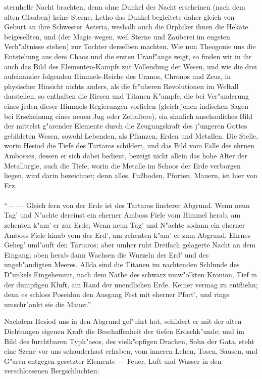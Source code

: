 \documentclass[a4paper, 11pt, oneside, polutonikogreek, german]{article}
\begin{document}
\begin{enumerate}
sternhelle Nacht brachten, denn ohne Dunkel der Nacht erscheinen (nach dem alten Glauben) keine Sterne, Letho das Dunkel begleitete daher gleich von Geburt an ihre Schwester Asteria, weshalb auch die Orphiker ihnen die Hekate beigesellten, und (der Magie wegen, weil Sterne und Zauberei im engsten Verh"altnisse stehen) zur Tochter derselben machten. Wie nun Theogonie uns die Entstehung aus dem Chaos und die ersten Uranf"ange zeigt, so finden wir in ihr auch das Bild des Elementen-Kampfs zur Vollendung der Wesen, und wie die drei aufeinander folgenden Himmels-Reiche des Uranos, Chronos und Zeus, in physischer Hinsicht nichts anders, als die fr"uheren Revolutionen im Weltall darstellen, so enthalten die Riesen und Titanen K"ampfe, die bei Ver"anderung eines jeden dieser Himmels-Regierungen vorfielen (gleich jenen indischen Sagen bei Erscheinung eines neuen Jug oder Zeitalters), ein sinnlich anschauliches Bild der mittelst g"arender Elemente durch die Zeugungskraft des j"ungeren Gottes gebildeten Wesen, sowohl Lebenden, als Pflanzen, Erden und Metallen. Die Stelle, worin Hesiod die Tiefe des Tartaros schildert, und das Bild vom Falle des ehrnen Ambosses, dessen er sich dabei bedient, bezeigt nicht allein das hohe Alter der Metallurgie, auch die Tiefe, worin die Metalle im Schoos der Erde verborgen liegen, wird darin bezeichnet; denn alles, Fußboden, Pforten, Mauern, ist hier von Erz.
\end{enumerate}
\paragraph{}
"`--- --- Gleich fern von der Erde ist des Tartaros finsterer Abgrund. Wenn neun Tag' und N"achte dereinst ein eherner Amboss Fiele vom Himmel herab, am zehenten k"am' er zur Erde; Wenn neun Tag' und N"achte sodann ein eherner Amboss Fiele hinab vom der Erd', am zehenten k"am' er zum Abgrund. Ehrnes Geheg' uml"auft den Tartaros; aber umher ruht Dreifach gelagerte Nacht an dem Eingang; oben herab dann Wachsen die Wurzeln der Erd' und des ungeb"andigten Meeres. Allda sind die Titanen im nachtenden Schlunde des D"unkels Eingehemmt, nach dem Nathe des schwarz umw"olkten Kronion, Tief in der dumpfigen Kluft, am Rand der unendlichen Erde. Keiner vermag zu entfliehn; denn es schloss Poseidon den Ausgang Fest mit eherner Pfort', und rings umschr"ankt sie die Mauer."'

Nachdem Hesiod uns in den Abgrund gef"uhrt hat, schildert er mit der alten Dichtungen eigenen Kraft die Beschaffenheit der tiefen Erdschk"unde; und im Bild des furchtbaren Typh"aeos, des vielk"opfigen Drachen, Sohn der Gata, steht eine Szene vor uns schauderhast erhaben, vom inneren Lehen, Tosen, Sausen, und G"aren entgegen gesetzter Elemente --- Feuer, Luft und Wasser in den verschlossenen Bergschluchten:
\end{document}
